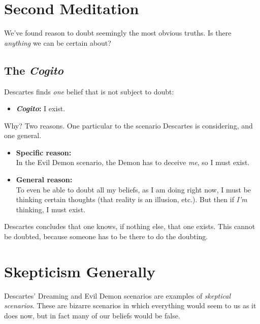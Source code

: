 \documentclass[english, a4paper]{article}
\begin{document}
\section{Second Meditation}

We've found reason to doubt seemingly the most obvious truths. Is there \textit{anything} we can be certain about?

\subsection*{The \emph{Cogito}}

Descartes finds \emph{one} belief that is not subject to doubt:

\begin{itemize}
  \item[] \textbf{\emph{Cogito}:} I exist.
\end{itemize}

Why? Two reasons. One particular to the scenario Descartes is considering, and one general.

\begin{itemize}
  \item[] \textbf{Specific reason:}\\ In the Evil Demon scenario, the Demon has to deceive \emph{me}, so I must exist.\\[-6pt]
  \item[] \textbf{General reason:}\\ To even be able to doubt all my beliefs, as I am doing right now, I must be thinking certain thoughts (that reality is an illusion, etc.). But then if \textit{I'm} thinking, I must exist.
\end{itemize}

Descartes concludes that one knows, if nothing else, that one exists. This cannot be doubted, because someone has to be there to do the doubting.

\section{Skepticism Generally}

Descartes' Dreaming and Evil Demon scenarios are examples of \textit{skeptical scenarios}. These are bizarre scenarios in which everything would seem to us as it does now, but in fact many of our beliefs would be false.
\end{document}
